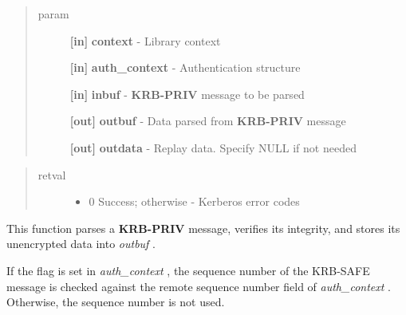 \documentclass[letterpaper,10pt,english]{sphinxmanual}
\begin{document}
\begin{fulllineitems}
\label{appdev/refs/api/krb5_rd_priv:c.krb5_rd_priv}
\end{fulllineitems}

\begin{quote}\begin{description}
\item[{param}] \leavevmode
\textbf{{[}in{]}} \textbf{context} - Library context

\textbf{{[}in{]}} \textbf{auth\_context} - Authentication structure

\textbf{{[}in{]}} \textbf{inbuf} - \textbf{KRB-PRIV} message to be parsed

\textbf{{[}out{]}} \textbf{outbuf} - Data parsed from \textbf{KRB-PRIV} message

\textbf{{[}out{]}} \textbf{outdata} - Replay data. Specify NULL if not needed

\end{description}\end{quote}
\begin{quote}\begin{description}
\item[{retval}] \leavevmode\begin{itemize}
\item {} 
0   Success; otherwise - Kerberos error codes

\end{itemize}

\end{description}\end{quote}

This function parses a \textbf{KRB-PRIV} message, verifies its integrity, and stores its unencrypted data into \emph{outbuf} .

If the {\hyperref[appdev/refs/macros/KRB5_AUTH_CONTEXT_DO_SEQUENCE:KRB5_AUTH_CONTEXT_DO_SEQUENCE]{}} flag is set in \emph{auth\_context} , the sequence number of the KRB-SAFE message is checked against the remote sequence number field of \emph{auth\_context} . Otherwise, the sequence number is not used.
\end{document}
